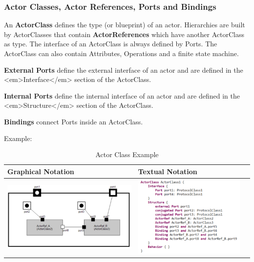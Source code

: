 \subsubsection{Actor Classes, Actor References, Ports and Bindings}

An \textbf{ActorClass} defines the type (or blueprint) of an actor. Hierarchies are built by ActorClasses 
that contain \textbf{ActorReferences} which have another ActorClass as type. The interface of an 
ActorClass is always defined by Ports. The ActorClass can also contain Attributes, Operations and a finite 
state machine. 

\textbf{External Ports} define the external interface of an actor and are defined in the <em>Interface</em> 
section of the ActorClass.

\textbf{Internal Ports} define the internal interface of an actor and are defined in the <em>Structure</em> 
section of the ActorClass.

\textbf{Bindings} connect Ports inside an ActorClass.

Example:

\begin{table}
\caption{Actor Class Example}
\begin{tabular}{|l|l|l|}
\hline
 \textbf{Graphical Notation} & \textbf{Textual Notation} \\ \hline
 \includegraphics[scale=0.7]{images/040-ActorClass.png} & 
\includegraphics[scale=0.7]{images/040-ActorClassExampleTextualNotation.png} \\ \hline
 \end{tabular}
 \end{table}
 
